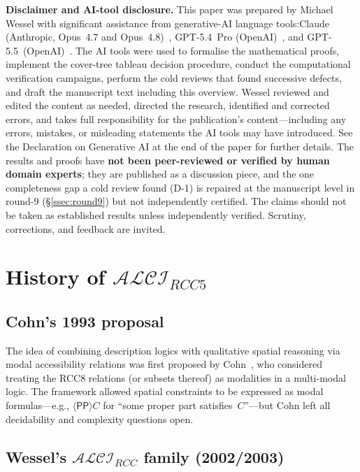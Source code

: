 \documentclass[
]{ceurart}
\theoremstyle{definition}
\newcommand{\ALCIRCC}[1]{\ensuremath{\mathcal{ALCI}_{\mathit{RCC#1}}}}
\newcommand{\PP}{\ensuremath{\mathsf{PP}}}
\begin{document}
\textbf{Disclaimer and AI-tool disclosure.}
This paper was prepared by Michael Wessel with significant
assistance from generative-AI language tools:\@ Claude
(Anthropic, Opus~4.7 and Opus~4.8)~\cite{ClaudeOpus47}, GPT-5.4~Pro
(OpenAI)~\cite{GPT54Pro}, and GPT-5.5~(OpenAI)~\cite{GPT55Repaired}.
The AI tools were used to formalise the mathematical proofs,
implement the cover-tree tableau decision procedure, conduct the
computational verification campaigns, perform the cold reviews
that found successive defects, and draft the manuscript text
including this overview.  Wessel reviewed and edited the content
as needed, directed the research, identified and corrected errors,
and takes full responsibility for the publication's content---including
any errors, mistakes, or misleading statements the AI tools may
have introduced.  See the Declaration on Generative AI at the end
of the paper for further details.  The results and proofs have
\textbf{not been peer-reviewed or verified by human domain
experts}; they are published as a discussion piece, and the one
completeness gap a cold review found (D-1) is repaired at the
manuscript level in round-9 (\S\ref{ssec:round9}) but not
independently certified.  The claims should not be taken as
established results unless independently verified.
Scrutiny, corrections, and feedback are invited.

\section{History of $\ALCIRCC{5}$}
\label{sec:history}

\subsection{Cohn's 1993 proposal}

The idea of combining description logics with qualitative spatial
reasoning via modal accessibility relations was first proposed by
Cohn~\cite{Cohn1993}, who considered treating the RCC8 relations
(or subsets thereof) as modalities in a multi-modal logic.
The framework allowed spatial constraints to be expressed as
modal formulas---e.g., $\langle \PP \rangle C$ for ``some proper
part satisfies~$C$''---but Cohn left all decidability and complexity
questions open.

\subsection{Wessel's $\ALCIRCC{}$ family (2002/2003)}
\end{document}
